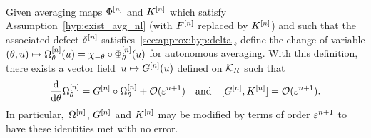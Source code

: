 \begin{proposition} \label{sec:approx:thm:commut} \hspace*{1em} 
\\
  Given averaging maps $\Phi^{[n]}$ and $K^{[n]}$ which satisfy
  Assumption~\ref{hyp:exist_avg_nl} (with $F^{[n]}$ replaced by $K^{[n]}$)
  and such that the associated defect $\delta^{[n]}$
  satisfies~\eqref{sec:approx:hyp:delta}, define the change of variable
  $(\theta, u) \mapsto \Omega^{[n]} _\theta(u) = \chi _{-\theta} \circ
  \Phi^{[n]} _\theta(u)$ for autonomous averaging. With this definition,
  there exists a vector field~$u \mapsto G^{[n]}(u)$ defined on $\mathcal{K}_R$
  such that
  \begin{equation*}
    \frac{\mathrm{d}}{\mathrm{d} \theta} \Omega^{[n]} _\theta 
    = G^{[n]} \circ \Omega^{[n]} _\theta + \mathcal{O}(\varepsilon^{n+1})
    \quad\text{and}\quad
    [G^{[n]}, K^{[n]}] = \mathcal{O}(\varepsilon^{n+1}) .
  \end{equation*}
  In particular,~$\Omega^{[n]}$, $G^{[n]}$ and $K^{[n]}$ may be modified by
  terms of order $\varepsilon^{n+1}$ to have these identities met with no
  error.
\end{proposition}

